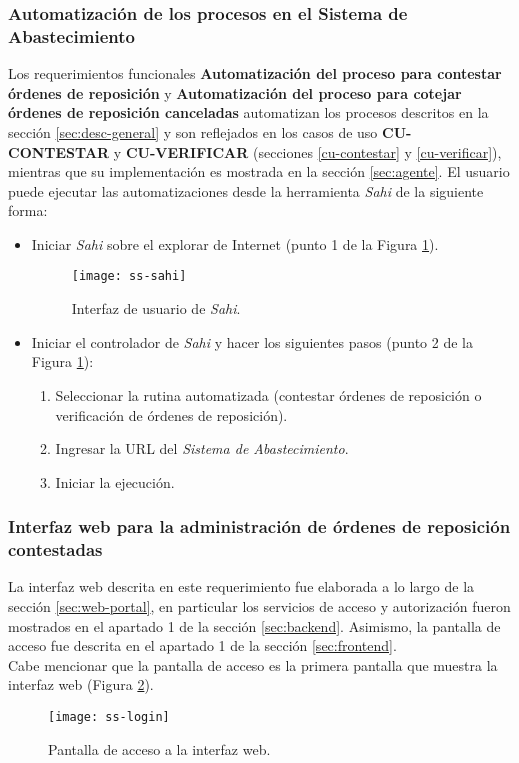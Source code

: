 \subsubsection{Automatización de los procesos en el Sistema de Abastecimiento}
Los requerimientos funcionales \textbf{Automatización del proceso para contestar órdenes de reposición} y \textbf{Automatización del proceso para cotejar órdenes de reposición canceladas} automatizan los procesos descritos en la sección \ref{sec:desc-general} y son reflejados en los casos de uso \textbf{CU-CONTESTAR} y \textbf{CU-VERIFICAR} (secciones \ref{cu-contestar} y \ref{cu-verificar}), mientras que su implementación es mostrada en la sección \ref{sec:agente}. El usuario puede ejecutar las automatizaciones desde la herramienta \textit{Sahi} de la siguiente forma:
\begin{itemize}
	\item Iniciar \textit{Sahi} sobre el explorar de Internet (punto 1 de la Figura \ref{fig:ss-sahi}).
	\begin{figure}[h]
		\centering
		\texttt{[image: ss-sahi]}
		\caption{Interfaz de usuario de \textit{Sahi}.}
		\label{fig:ss-sahi}
	\end{figure}

	\item Iniciar el controlador de \textit{Sahi} y hacer los siguientes pasos (punto 2 de la Figura \ref{fig:ss-sahi}):
	\begin{enumerate}
		\item Seleccionar la rutina automatizada (contestar órdenes de reposición o verificación de órdenes de reposición).
		\item Ingresar la URL del \textit{Sistema de Abastecimiento}.
		\item Iniciar la ejecución.
	\end{enumerate}
\end{itemize}

\pagebreak

\subsubsection{Interfaz web para la administración de órdenes de reposición contestadas}
La interfaz web descrita en este requerimiento fue elaborada a lo largo de la sección \ref{sec:web-portal}, en particular los servicios de acceso y autorización fueron mostrados en el apartado 1 de la sección \ref{sec:backend}. Asimismo, la pantalla de acceso fue descrita en el apartado 1 de la sección \ref{sec:frontend}.\\
Cabe mencionar que la pantalla de acceso es la primera pantalla que muestra la interfaz web (Figura \ref{fig:ss-login}).
\begin{figure}[h]
	\centering
	\texttt{[image: ss-login]}
	\caption{Pantalla de acceso a la interfaz web.}
	\label{fig:ss-login}
\end{figure}

